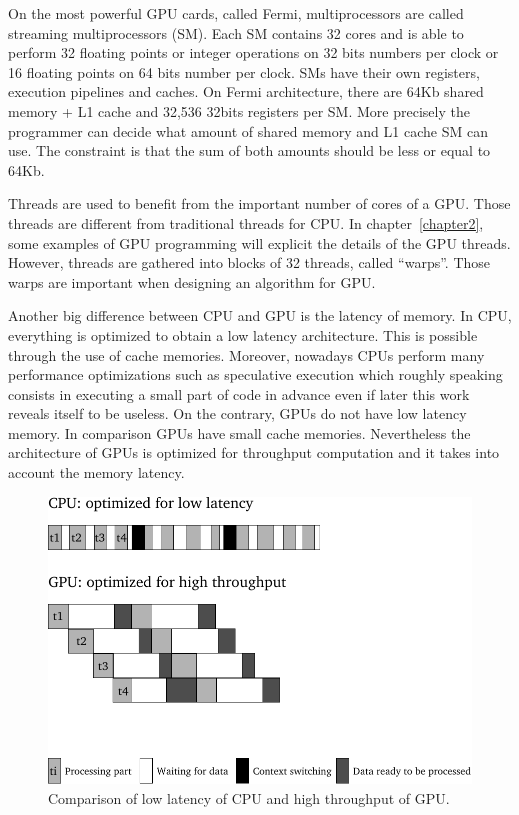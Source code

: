 On the most powerful  GPU cards, called Fermi, multiprocessors  are called streaming
multiprocessors  (SM). Each  SM contains  32  cores and  is able  to perform  32
floating points or integer operations on  32 bits numbers per clock or 16 floating
points  on  64 bits number  per  clock. SMs  have  their  own registers,  execution
pipelines and caches.  On Fermi architecture,  there are 64Kb shared memory + L1
cache  and 32,536 32bits  registers per  SM. More  precisely the  programmer can
decide what amount  of shared memory and  L1 cache SM can use.  The constraint is
that the sum of both amounts should be less or equal to 64Kb.

Threads are used to  benefit from the important number of cores  of a GPU. Those
threads    are   different    from    traditional   threads    for   CPU.     In
chapter~\ref{chapter2},  some  examples of  GPU  programming  will explicit  the
details of  the GPU  threads. However,  threads are gathered  into blocks  of 32
threads, called ``warps''. Those warps  are important when designing an algorithm
for GPU.


Another big  difference between CPU and GPU  is the latency of  memory.  In CPU,
everything is optimized  to obtain a low latency  architecture. This is possible
through  the  use  of  cache  memories. Moreover,  nowadays  CPUs  perform  many
performance optimizations  such as speculative execution  which roughly speaking
consists in executing  a small part of  code in advance even if  later this work
reveals itself  to be  useless. On the  contrary, GPUs  do not have  low latency
memory.   In comparison GPUs  have small  cache memories.  Nevertheless the
architecture of GPUs is optimized  for throughput computation and it takes into
account the memory latency.



\begin{figure}[b!]
\centerline{\includegraphics[scale=0.7]{Chapters/chapter1/figures/low_latency_vs_high_throughput.pdf}}
\caption{Comparison of low latency of CPU and high throughput of GPU.}
\label{ch1:fig:latency_throughput}
\end{figure}


